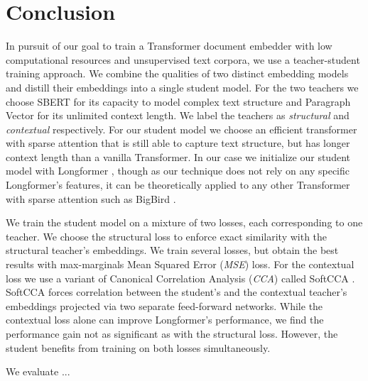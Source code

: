 \chapter*{Conclusion}

In pursuit of our goal to train a Transformer document embedder with low
computational resources and unsupervised text corpora, we use a teacher-student
training approach. We combine the qualities of two distinct embedding models
and distill their embeddings into a single student model. For the two teachers
we choose SBERT \citep{reimers2019sentence} for its capacity to model complex
text structure and Paragraph Vector \citep{le2014distributed} for its
unlimited context length. We label the teachers as \emph{structural} and
\emph{contextual} respectively. For our student model we choose an efficient
transformer with sparse attention that is still able to capture text structure,
but has longer context length than a vanilla Transformer. In our case we
initialize our student model with Longformer \citep{beltagy2020longformer},
though as our technique does not rely on any specific Longformer's features, it
can be theoretically applied to any other Transformer with sparse attention
such as BigBird \citep{zaheer2020big}.

We train the student model on a mixture of two losses, each corresponding to
one teacher. We choose the structural loss to enforce exact similarity with the
structural teacher's embeddings. We train several losses, but obtain the best
results with max-marginals Mean Squared Error (\emph{MSE}) loss. For the
contextual loss we use a variant of Canonical Correlation Analysis (\emph{CCA})
\citep{hotelling1992relations} called SoftCCA \citep{chen2016training}. SoftCCA
forces correlation between the student's and the contextual teacher's
embeddings projected via two separate feed-forward networks. While the
contextual loss alone can improve Longformer's performance, we find the
performance gain not as significant as with the structural loss. However, the
student benefits from training on both losses simultaneously.

We evaluate ...


